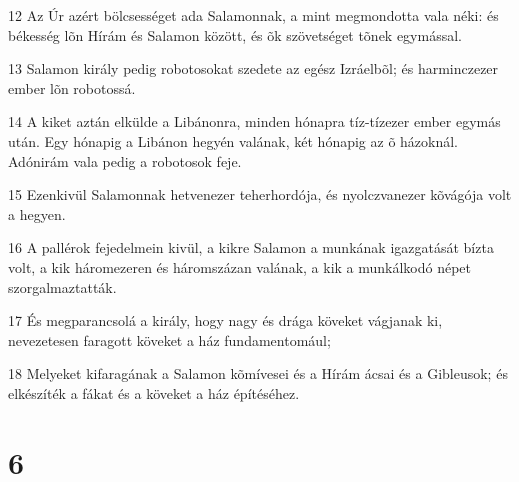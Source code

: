 \par 12 Az Úr azért bölcsességet ada Salamonnak, a mint megmondotta vala néki: és békesség lõn Hírám és Salamon között, és õk szövetséget  tõnek egymással.
\par 13 Salamon király pedig robotosokat szedete az egész Izráelbõl; és harminczezer ember lõn robotossá.
\par 14 A kiket aztán elkülde a Libánonra, minden hónapra tíz-tízezer ember egymás után. Egy hónapig a Libánon hegyén valának, két hónapig az õ házoknál. Adónirám vala pedig a robotosok feje.
\par 15 Ezenkivül Salamonnak hetvenezer teherhordója, és nyolczvanezer kõvágója volt a hegyen.
\par 16 A pallérok fejedelmein kivül, a kikre Salamon a munkának igazgatását bízta volt, a kik háromezeren és háromszázan valának, a kik a munkálkodó népet szorgalmaztatták.
\par 17 És megparancsolá a király, hogy nagy és drága köveket vágjanak ki, nevezetesen faragott köveket a ház fundamentomául;
\par 18 Melyeket kifaragának a Salamon kõmívesei és a Hírám ácsai és a Gibleusok; és elkészíték a fákat és a köveket a ház építéséhez.

\chapter{6}

